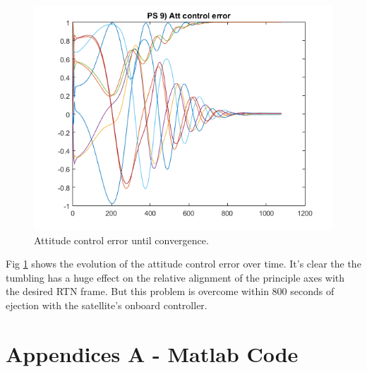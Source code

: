 \documentclass[12pt, letterpaper]{article}
\begin{document}
\begin{figure}[H]
	\centering
	\includegraphics[scale=0.9]{ps9_04}
	\caption{Attitude control error until convergence.}
	\label{9:atterror}
\end{figure}

Fig \ref{9:atterror} shows the evolution of the attitude control error over time. It's clear the the tumbling has a huge effect on the relative alignment of the principle axes with the desired RTN frame. But this problem is overcome within 800 seconds of ejection with the satellite's onboard controller.



\section{Appendices A - Matlab Code}


\end{document}
